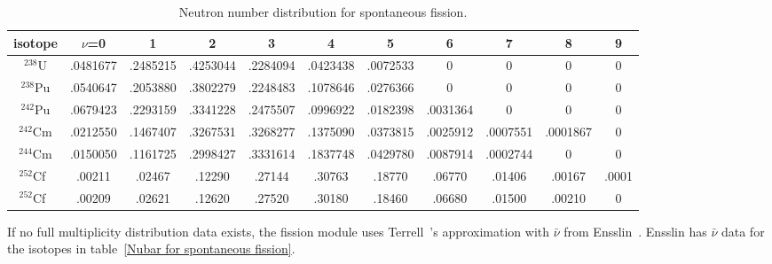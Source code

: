 \documentclass[11pt]{article}
\begin{document}
\begin{table}[ht]
\footnotesize
\begin{center}
\begin{tabular}{|c|cccccccccc|} \hline
isotope & $\nu$=0 & 1 & 2 & 3 & 4 & 5 & 6 & 7 & 8 & 9 \\ \hline
$^{238}$U & .0481677 & .2485215 & .4253044 & .2284094 & .0423438 & .0072533 & 0 & 0 & 0 & 0 \\
$^{238}$Pu & .0540647 & .2053880 & .3802279 & .2248483 & .1078646 & .0276366 & 0 & 0 & 0 & 0 \\
$^{242}$Pu & .0679423 & .2293159 & .3341228 & .2475507 & .0996922 & .0182398 & .0031364 & 0 & 0 & 0 \\
$^{242}$Cm & .0212550 & .1467407 & .3267531 & .3268277 & .1375090 & .0373815 & .0025912 & .0007551 & .0001867 & 0 \\
$^{244}$Cm & .0150050 & .1161725 & .2998427 & .3331614 & .1837748 & .0429780 & .0087914 & .0002744 & 0 & 0 \\
$^{252}$Cf~\cite{Spencer 1982} & .00211 & .02467 & .12290 & .27144 & .30763 & .18770 & .06770 & .01406 & .00167 & .0001 \\
$^{252}$Cf~\cite{Boldeman 1985} & .00209 & .02621 & .12620 & .27520 & .30180 & .18460 & .06680 & .01500& .00210 & 0 \\ \hline
\end{tabular}
\end{center}
\caption{Neutron number distribution for spontaneous fission.}
\label{Neutron number distribution for spontaneous fission}
\end{table}

If no full multiplicity distribution data exists, the fission module
uses Terrell~\cite{Terrell 1957}'s approximation with $\bar{\nu}$ from
Ensslin~\cite{Ensslin 1998}.  Ensslin has $\bar{\nu}$ data for the
isotopes in table~\ref{Nubar for spontaneous fission}.
\end{document}

